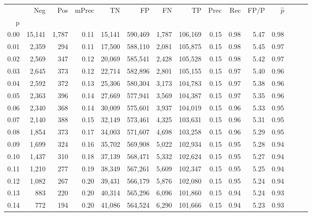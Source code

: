 \begin{tabular}{rrrrrrrrrrrrrrr}
\toprule
{} &     Neg &     Pos & mPrec &       TN &       FP &       FN &       TP &  Prec &   Rec &  FP/P & $\hat{p}$ \\
p    &         &         &       &          &          &          &          &       &       &       &           \\
\midrule
0.00 &  15,141 &   1,787 &  0.11 &   15,141 &  590,469 &    1,787 &  106,169 &  0.15 &  0.98 &  5.47 &      0.98 \\
0.01 &   2,359 &     294 &  0.11 &   17,500 &  588,110 &    2,081 &  105,875 &  0.15 &  0.98 &  5.45 &      0.97 \\
0.02 &   2,569 &     347 &  0.12 &   20,069 &  585,541 &    2,428 &  105,528 &  0.15 &  0.98 &  5.42 &      0.97 \\
0.03 &   2,645 &     373 &  0.12 &   22,714 &  582,896 &    2,801 &  105,155 &  0.15 &  0.97 &  5.40 &      0.96 \\
0.04 &   2,592 &     372 &  0.13 &   25,306 &  580,304 &    3,173 &  104,783 &  0.15 &  0.97 &  5.38 &      0.96 \\
0.05 &   2,363 &     396 &  0.14 &   27,669 &  577,941 &    3,569 &  104,387 &  0.15 &  0.97 &  5.35 &      0.96 \\
0.06 &   2,340 &     368 &  0.14 &   30,009 &  575,601 &    3,937 &  104,019 &  0.15 &  0.96 &  5.33 &      0.95 \\
0.07 &   2,140 &     388 &  0.15 &   32,149 &  573,461 &    4,325 &  103,631 &  0.15 &  0.96 &  5.31 &      0.95 \\
0.08 &   1,854 &     373 &  0.17 &   34,003 &  571,607 &    4,698 &  103,258 &  0.15 &  0.96 &  5.29 &      0.95 \\
0.09 &   1,699 &     324 &  0.16 &   35,702 &  569,908 &    5,022 &  102,934 &  0.15 &  0.95 &  5.28 &      0.94 \\
0.10 &   1,437 &     310 &  0.18 &   37,139 &  568,471 &    5,332 &  102,624 &  0.15 &  0.95 &  5.27 &      0.94 \\
0.11 &   1,210 &     277 &  0.19 &   38,349 &  567,261 &    5,609 &  102,347 &  0.15 &  0.95 &  5.25 &      0.94 \\
0.12 &   1,082 &     267 &  0.20 &   39,431 &  566,179 &    5,876 &  102,080 &  0.15 &  0.95 &  5.24 &      0.94 \\
0.13 &     883 &     220 &  0.20 &   40,314 &  565,296 &    6,096 &  101,860 &  0.15 &  0.94 &  5.24 &      0.93 \\
0.14 &     772 &     194 &  0.20 &   41,086 &  564,524 &    6,290 &  101,666 &  0.15 &  0.94 &  5.23 &      0.93 \\

\end{tabular}
